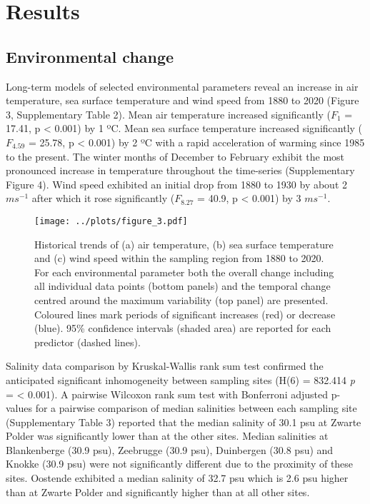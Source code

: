 \documentclass[smallextended]{svjour3}       %
\begin{document}
\hypertarget{results}{%
\section{Results}\label{results}}

\hypertarget{environmental-change}{%
\subsection{Environmental change}\label{environmental-change}}

Long-term models of selected environmental parameters reveal an increase
in air temperature, sea surface temperature and wind speed from 1880 to
2020 (Figure 3, Supplementary Table 2). Mean air temperature increased
significantly (\(F_{1}\) = 17.41, p \textless{} 0.001) by 1 ºC. Mean sea
surface temperature increased significantly (\(F_{4.59}\) = 25.78, p
\textless{} 0.001) by 2 ºC with a rapid acceleration of warming since
1985 to the present. The winter months of December to February exhibit
the most pronounced increase in temperature throughout the time-series
(Supplementary Figure 4). Wind speed exhibited an initial drop from 1880
to 1930 by about 2 \(ms^{-1}\) after which it rose significantly
(\(F_{8.27}\) = 40.9, p \textless{} 0.001) by 3 \(ms^{-1}\).

\begin{figure}
\centering
\texttt{[image: ../plots/figure\_3.pdf]}
\caption{Historical trends of (a) air temperature, (b) sea surface
temperature and (c) wind speed within the sampling region from 1880 to
2020. For each environmental parameter both the overall change including
all individual data points (bottom panels) and the temporal change
centred around the maximum variability (top panel) are presented.
Coloured lines mark periods of significant increases (red) or decrease
(blue). 95\% confidence intervals (shaded area) are reported for each
predictor (dashed lines).}
\end{figure}

Salinity data comparison by Kruskal-Wallis rank sum test confirmed the
anticipated significant inhomogeneity between sampling sites (H(6) =
832.414 \emph{p} = \textless{} 0.001). A pairwise Wilcoxon rank sum test
with Bonferroni adjusted p-values for a pairwise comparison of median
salinities between each sampling site (Supplementary Table 3) reported
that the median salinity of 30.1 psu at Zwarte Polder was significantly
lower than at the other sites. Median salinities at Blankenberge (30.9
psu), Zeebrugge (30.9 psu), Duinbergen (30.8 psu) and Knokke (30.9 psu)
were not significantly different due to the proximity of these sites.
Oostende exhibited a median salinity of 32.7 psu which is 2.6 psu higher
than at Zwarte Polder and significantly higher than at all other sites.
\end{document}
